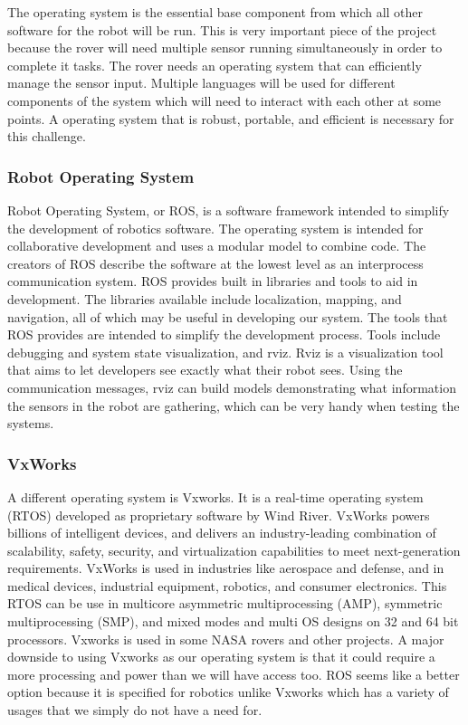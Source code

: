 \documentclass[10pt, oneside,onecolumn]{IEEEtran}
\begin{document}
\begin{titlepage}
	The operating system is the essential base component from which all other software for the robot will be run. This is very important piece of the project because the rover will need multiple sensor running simultaneously in order to complete it tasks. The rover needs an operating system that can efficiently manage the sensor input. Multiple languages will be used for different components of the system which will need to interact with each other at some points. A operating system that is robust, portable, and efficient is necessary for this challenge.

\subsubsection{Robot Operating System}

Robot Operating System, or ROS, is a software framework intended to simplify the development of robotics software. The operating system is intended for collaborative development and uses a modular model to combine code. The creators of ROS describe the software at the lowest level as an interprocess communication system. ROS provides built in libraries and tools to aid in development. The libraries available include localization, mapping, and navigation, all of which may be useful in developing our system. The tools that ROS provides are intended to simplify the development process. Tools include debugging and system state visualization, and rviz. Rviz is a visualization tool that aims to let developers see exactly what their robot sees. Using the communication messages, rviz can build models demonstrating what information the sensors in the robot are gathering, which can be very handy when testing the systems. 
 
\subsubsection{VxWorks}

	A different operating system is Vxworks. It is a real-time operating system (RTOS) developed as proprietary software by Wind River. VxWorks powers billions of intelligent devices, and delivers an industry-leading combination of scalability, safety, security, and virtualization capabilities to meet next-generation requirements. VxWorks is used in industries like aerospace and defense, and in medical devices, industrial equipment, robotics, and consumer electronics. This RTOS can be use in multicore asymmetric multiprocessing (AMP), symmetric multiprocessing (SMP), and mixed modes and multi OS designs on 32 and 64 bit processors. Vxworks is used in some NASA rovers and other projects. A major downside to using Vxworks as our operating system is that it could require a more processing and power than we will have access too. ROS seems like a better option because it is specified for robotics unlike Vxworks which has a variety of usages that we simply do not have a need for.


\end{titlepage}
\end{document}
